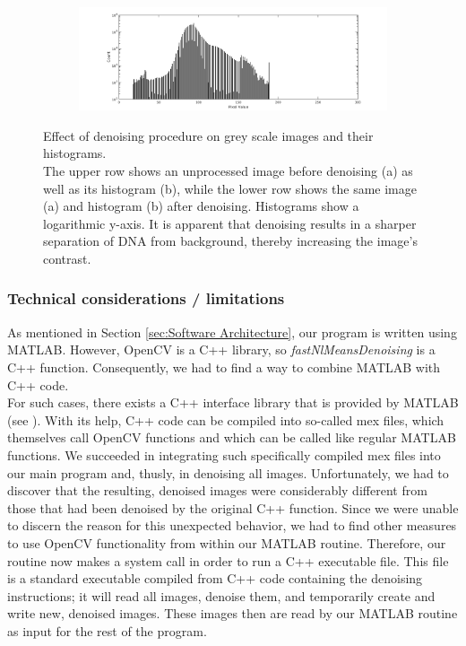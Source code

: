 \documentclass{article}
\begin{document}
\begin{figure}[htb!]
\begin{subfigure}{0.7\textwidth}
		\vspace{0.1cm}

		\includegraphics[width=\linewidth]{afterDenoise_histogram.png}
		\caption{}
		\label{fig:denoising_histograms}
	\end{subfigure}
	\caption{Effect of denoising procedure on grey scale images and their histograms.\\
		The upper row shows an unprocessed image before denoising (a) as well as its histogram (b), while the lower row shows the same image (a) and histogram (b) after denoising. Histograms show a logarithmic y-axis. It is apparent that denoising results in a sharper separation of DNA from background, thereby increasing the image's contrast.}
	\label{fig:denoising}
\end{figure}

\subsubsection{Technical considerations / limitations}
As mentioned in Section \ref{sec:Software Architecture}, our program is written using MATLAB. However, OpenCV is a C++ library, so \textit{fastNlMeansDenoising} is a C++ function. Consequently, we had to find a way to combine MATLAB with C++ code. \\
For such cases, there exists a C++ interface library that is provided by MATLAB (see \cite{opencvInterfaceSupport}). With its help, C++ code can be compiled into so-called mex files, which themselves call OpenCV functions and which can be called like regular MATLAB functions. We succeeded in integrating such specifically compiled mex files into our main program and, thusly, in denoising all images. Unfortunately, we had to discover that the resulting, denoised images were considerably different from those that had been denoised by the original C++ function. Since we were unable to discern the reason for this unexpected behavior, we had to find other measures to use OpenCV functionality from within our MATLAB routine. Therefore, our routine now makes a system call in order to run a C++ executable file. This file is a standard executable compiled from C++ code containing the denoising instructions; it will read all images, denoise them, and temporarily create and write new, denoised images. These images then are read by our MATLAB routine as input for the rest of the program.
\end{document}
